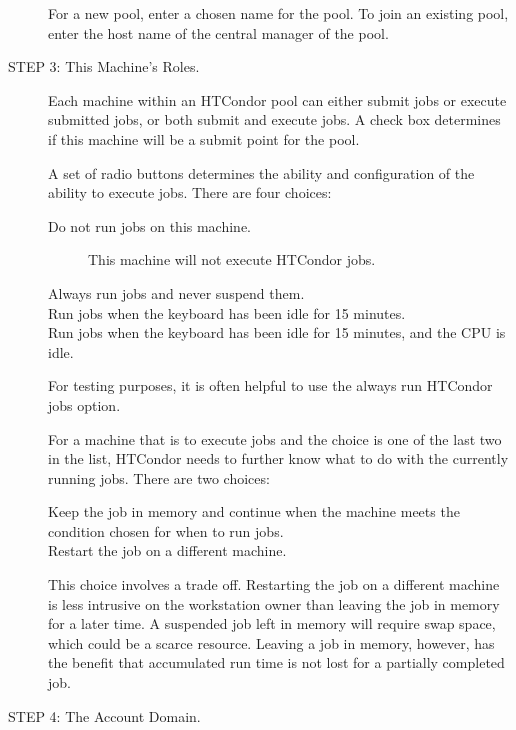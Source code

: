 \begin{description}
     For a new pool, enter a chosen name for the pool.
     To join an existing pool, 
     enter the host name of the central manager of the pool.

\item[STEP 3: This Machine's Roles.] 

     Each machine within an HTCondor pool can either
     submit jobs or execute submitted jobs, or both
     submit and execute jobs.
     A check box determines if this machine will be a submit point for
     the pool.

     A set of radio buttons determines the ability and configuration of
     the ability to execute jobs.
     There are four choices:
     \begin{description}
     \item[Do not run jobs on this machine.]
     This machine will not execute HTCondor jobs.
     \item[Always run jobs and never suspend them.]
     \item[Run jobs when the keyboard has been idle for 15 minutes.]
     \item[Run jobs when the keyboard has been idle for 15 minutes,
and the CPU is idle.]
     \end{description}

     For testing purposes, it is often helpful to use the always run HTCondor
     jobs option. 

     For a machine that is to execute jobs and the choice is one of
the last two in the list,
HTCondor needs to further know what to do with the currently running jobs.
There are two choices:
     \begin{description}
     \item[Keep the job in memory and continue when the machine meets
the condition chosen for when to run jobs.]
     \item[Restart the job on a different machine.]
     \end{description}

     This choice involves a trade off.
     Restarting the job on a different machine is less intrusive
     on the workstation owner than leaving the job in memory for a later time.
     A suspended job left in memory will require swap space,
     which could be a scarce resource.
     Leaving a job in memory, however, has the benefit that accumulated
     run time is not lost for a partially completed job.

\item[STEP 4: The Account Domain.]


\end{description}
